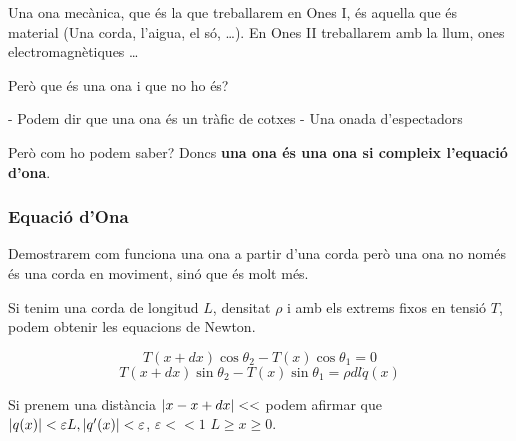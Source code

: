 \documentclass[12pt]{article}
\newcommand{\axes}[4]{%
  \draw[ax] (0,0) -- (#1,0) node[right, black] {#3};
  \draw[ax] (0,0) -- (0,#2) node[above, black] {#4};}
\begin{document}
Una ona mecànica, que és la que treballarem en Ones I, és aquella que és material (Una corda, l'aigua, el só, \dots). En Ones II treballarem amb la llum, ones electromagnètiques \dots

Però que és una ona i que no ho és?

\noindent - Podem dir que una ona és un tràfic de cotxes 
\noindent - Una onada d'espectadors

Però com ho podem saber? Doncs \textbf{una ona és una ona si compleix l'equació d'ona}.

\subsubsection{Equació d'Ona}

Demostrarem com funciona una ona a partir d'una corda però una ona no només és una corda en moviment, sinó que és molt més.

\begin{center}
\end{center}

Si tenim una corda de longitud $L$, densitat $\rho$ i amb els extrems fixos en tensió $T$, podem obtenir les equacions de Newton.

\[T(x+dx)\cos \theta_2 - T(x)\cos \theta_1 = 0\]
\[T(x+dx)\sin \theta_2 - T(x)\sin \theta_1 = \rho dl \ddot{q}(x)\]

Si prenem una distància $\abs{x - x+dx}<<$ podem afirmar que $\abs{q(x)} < \varepsilon L, \abs{q'(x)} < \varepsilon$, $\varepsilon << 1$ $L \geq x \geq 0$.
\end{document}
